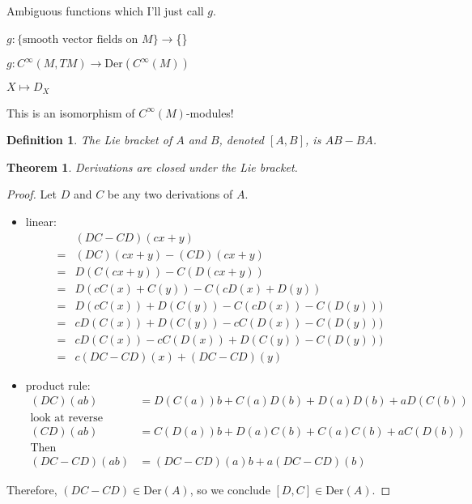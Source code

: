 \documentclass[11pt,leqno,oneside]{amsart}
\newcommand{\Der}{\text{Der}}
\newcommand{\de}{\emph}
\theoremstyle{mystyle} \newtheorem{thrm}[thm]{Theorem}
\theoremstyle{mystyle} \newtheorem{defi}[thm]{Definition}
\begin{document}
\begin{prop}
	Ambiguous functions which I'll just call $g$.

	$g : \{\text{smooth vector fields on $M$}\} \to $\{\}

	$g : C^\infty(M,TM) \to \Der(C^\infty(M))$

	$X \mapsto D_X$

	This is an isomorphism of $C^\infty(M)$-modules!
\end{prop}


\begin{defi}
	The \de{Lie bracket} of $A$ and $B$, denoted $[A,B]$, is $AB - BA$.
\end{defi}
\begin{thrm}
	Derivations are closed under the Lie bracket.
\end{thrm}
\begin{proof}
	Let $D$ and $C$ be any two derivations of $A$.
	\begin{itemize}
		\item linear:
		\begin{align}
			& (DC - CD)(cx + y) \\
			=& (DC)(cx + y) - (CD)(cx + y) \\
			=& D(C(cx + y)) - C(D(cx + y)) \\
			=& D(cC(x) + C(y)) - C(cD(x) + D(y)) \\
			=& D(cC(x)) + D(C(y)) - C(cD(x)) - C(D(y))) \\
			=& cD(C(x)) + D(C(y)) - cC(D(x)) - C(D(y))) \\
			=& cD(C(x)) - cC(D(x))+  D(C(y)) - C(D(y))) \\
			=& c(DC-CD)(x)      +    (DC-CD)(y)
		\end{align}
		\item product rule:
		\begin{align}
			(DC)(ab) &= D(C(a))b + C(a)D(b) + D(a)D(b) + aD(C(b)) \\
			\text{look at reverse} \\
			(CD)(ab) &= C(D(a))b + D(a)C(b) + C(a)C(b) + aC(D(b)) \\
			\text{Then} \\
			(DC - CD)(ab) &= (DC - CD)(a)b + a(DC - CD)(b)
		\end{align}
	\end{itemize}
	Therefore,  $(DC - CD) \in \Der(A)$, so we conclude $[D,C] \in \Der(A)$.
\end{proof}
\end{document}
